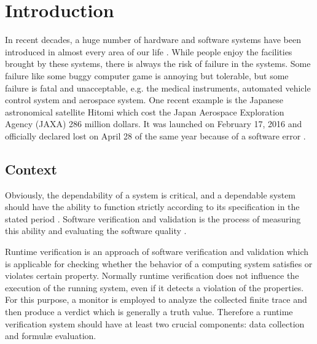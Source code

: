 
\chapter{Introduction}

In recent decades, a huge number of hardware and software systems have been introduced in almost every area of our life \citep{clarke1999model}. While people enjoy the facilities brought by these systems, there is always the risk of failure in the systems. Some failure like some buggy computer game is annoying but tolerable, but some failure is fatal and unacceptable, e.g. the medical instruments, automated vehicle control system and aerospace system. One recent example is the Japanese astronomical satellite Hitomi which cost the Japan Aerospace Exploration Agency (JAXA) 286 million dollars. It was launched on February 17, 2016 and officially declared lost on April 28 of the same year because of a software error \citep{nature2016}.

\section{Context}

Obviously, the dependability of a system is critical, and a dependable system should have the ability to function strictly according to its specification in the stated period \citep{avivzienis2004basic}. Software verification and validation is the process of measuring this ability and evaluating the software quality \citep{ieeestd2012}.

Runtime verification \citep{leucker2009brief} is an approach of software verification and validation which is applicable for checking whether the behavior of a computing system satisfies or violates certain property. Normally runtime verification does not influence the execution of the running system, even if it detects a violation of the properties. For this purpose, a monitor is employed to analyze the collected finite trace and then produce a verdict which is generally a truth value. Therefore a runtime verification system should have at least two crucial components: data collection and formul\ae{} evaluation. 


